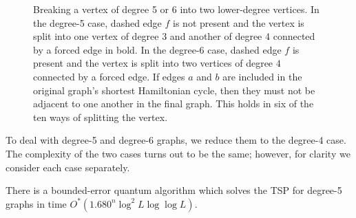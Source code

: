 \begin{figure}
\begin{center}
\end{center}
\caption[Breaking a vertex of degree 5 or 6 into two lower-degree vertices]{Breaking a vertex of degree 5 or 6 into two lower-degree vertices. In the degree-5 case, dashed edge $f$ is not present and the vertex is split into one vertex of degree $3$ and another of degree $4$ connected by a forced edge in bold. In the degree-6 case, dashed edge $f$ is present and the vertex is split into two vertices of degree $4$ connected by a forced edge. If edges $a$ and $b$ are included in the original graph's shortest Hamiltonian cycle, then they must not be adjacent to one another in the final graph. This holds in six of the ten ways of splitting the vertex. \label{fig:degree-5}}
\end{figure}

To deal with degree-5 and degree-6 graphs, we reduce them to the degree-4 case. The complexity of the two cases turns out to be the same; however, for clarity we consider each case separately.

\begin{theorem}
\label{thm:deg5}
There is a bounded-error quantum algorithm which solves the TSP for degree-5 graphs in time $O^*(1.680^n\log^2 L\log \log L)$.
\end{theorem}

